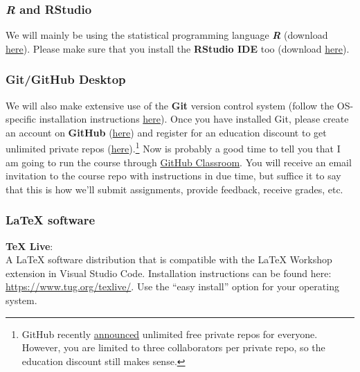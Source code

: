 \documentclass[11pt]{article}
\begin{document}
\vspace{-0.25cm}
\subsubsection*{\textit{R} and RStudio}

We will mainly be using the statistical programming language \textbf{\textit{R}} (download \href{https://www.r-project.org/}{here}). 
Please make sure that you install the \textbf{RStudio IDE} too (download \href{https://www.rstudio.com/products/rstudio/download/preview/}{here}).

\vspace{-0.25cm}
\subsubsection*{Git/GitHub Desktop}

We will also make extensive use of the \textbf{Git} version control system (follow the OS-specific installation instructions \href{http://happygitwithr.com/install-git.html}{here}). Once you have installed Git, please create an account on \textbf{GitHub} (\href{https://github.com/join}{here}) and register for an education discount to get unlimited private repos (\href{https://education.github.com/discount_requests/new}{here}).\footnote{GitHub recently \href{https://blog.github.com/changelog/2019-01-08-pricing-changes/}{announced} unlimited free private repos for everyone. However, you are limited to three collaborators per private repo, so the education discount still makes sense.} Now is probably a good time to tell you that I am going to run the course through \href{https://classroom.github.com/}{GitHub Classroom}. You will receive an email invitation to the course repo with instructions in due time, but suffice it to say that this is how we'll submit assignments, provide feedback, receive grades, etc.

\vspace{-0.25cm}
\subsubsection*{LaTeX software}
\textbf{TeX Live}: \\
A LaTeX software distribution that is compatible with the LaTeX Workshop extension in Visual Studio Code. Installation instructions can be found here: \url{https://www.tug.org/texlive/}. Use the ``easy install'' option for your operating system. \\
\end{document}
